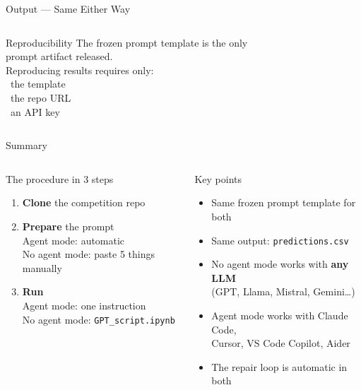 \documentclass[aspectratio=169,t,10pt]{beamer}
\begin{document}
\begin{frame}{Output --- Same Either Way}
\begin{columns}[T]
\vspace{8pt}
\begin{alertblock}{Reproducibility}
{\scriptsize
The frozen prompt template is the only\\
prompt artifact released.\\[2pt]
Reproducing results requires only:\\
\textbullet\ the template\\
\textbullet\ the repo URL\\
\textbullet\ an API key
}
\end{alertblock}
\end{columns}

\end{frame}

\begin{frame}{Summary}

\begin{columns}[T]
\begin{block}{The procedure in 3 steps}
\vspace{4pt}
{\small
\begin{enumerate}\itemsep=6pt
  \item \textbf{Clone} the competition repo
  \item \textbf{Prepare} the prompt\\
        \textcolor{GNNgreen}{\small Agent mode:} automatic\\
        \textcolor{GNNorange}{\small No agent mode:} paste 5 things manually
  \item \textbf{Run}\\
        \textcolor{GNNgreen}{\small Agent mode:} one instruction\\
        \textcolor{GNNorange}{\small No agent mode:} \texttt{GPT\_script.ipynb}
\end{enumerate}
}
\end{block}

\begin{exampleblock}{Key points}
\vspace{4pt}
{\small
\begin{itemize}\itemsep=4pt
  \item Same frozen prompt template for both
  \item Same output: \texttt{predictions.csv}
  \item No agent mode works with \textbf{any LLM}\\
        (GPT, Llama, Mistral, Gemini\ldots)
  \item Agent mode works with Claude Code,\\
        Cursor, VS Code Copilot, Aider
  \item The repair loop is automatic in both
\end{itemize}
}
\end{exampleblock}
\end{columns}


\end{frame}
\end{document}
